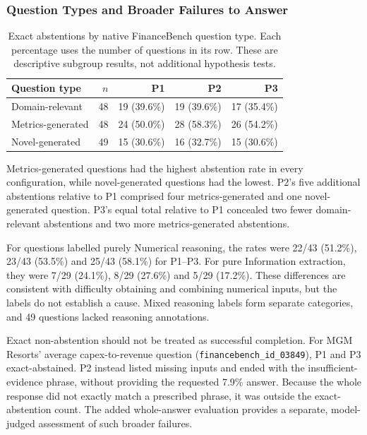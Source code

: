 \subsubsection{Question Types and Broader Failures to Answer}
\begin{table}[H]
\centering
\caption{Exact abstentions by native FinanceBench question type. Each
percentage uses the number of questions in its row. These are descriptive
subgroup results, not additional hypothesis tests.}
\label{tab:abstention-question-types}
\begin{tabular}{|l|r|r|r|r|}
\hline
\textbf{Question type} & \textbf{$n$} & \textbf{P1} & \textbf{P2} & \textbf{P3} \\
\hline
Domain-relevant & 48 & 19 (39.6\%) & 19 (39.6\%) & 17 (35.4\%) \\
Metrics-generated & 48 & 24 (50.0\%) & 28 (58.3\%) & 26 (54.2\%) \\
Novel-generated & 49 & 15 (30.6\%) & 16 (32.7\%) & 15 (30.6\%) \\
\hline
\end{tabular}
\end{table}

Metrics-generated questions had the highest abstention rate in every
configuration, while novel-generated questions had the lowest. P2's five
additional abstentions relative to P1 comprised four metrics-generated and
one novel-generated question. P3's equal total relative to P1 concealed two
fewer domain-relevant abstentions and two more metrics-generated abstentions.

For questions labelled purely Numerical reasoning, the rates were 22/43
(51.2\%), 23/43 (53.5\%) and 25/43 (58.1\%) for P1--P3. For pure
Information extraction, they were 7/29 (24.1\%), 8/29 (27.6\%) and 5/29
(17.2\%). These differences are consistent with difficulty obtaining and
combining numerical inputs, but the labels do not establish a cause. Mixed
reasoning labels form separate categories, and 49 questions lacked reasoning
annotations.

Exact non-abstention should not be treated as successful completion. For MGM
Resorts' average capex-to-revenue question
(\texttt{financebench\_id\_03849}), P1 and P3 exact-abstained. P2 instead
listed missing inputs and ended with the insufficient-evidence phrase,
without providing the requested 7.9\% answer. Because the whole response did
not exactly match a prescribed phrase, it was outside the exact-abstention
count. The added whole-answer evaluation provides a separate, model-judged
assessment of such broader failures.

